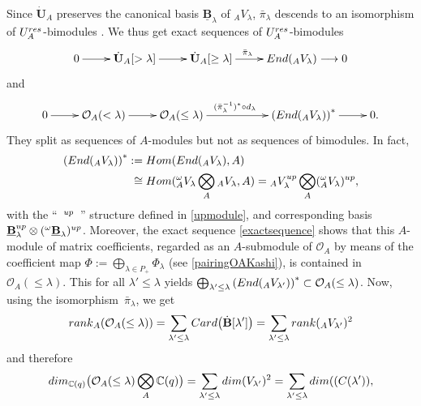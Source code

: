 \documentclass[11pt]{article}
\numberwithin{equation}{section}
\numberwithin{equation}{section}
\theoremstyle{definition}
\newcommand{\mc}{\mathbb{C}}
\newcommand{\Oo}{{\mathcal O}}
\newcommand{\ra}{\rightarrow}
\begin{document}
Since $\dot{\mathbf{U}}_A$ preserves the canonical basis $\underline{\mathbf{B}}_\lambda$ of ${}_AV_\lambda$, $\bar{\pi}_\lambda$ descends to an isomorphism of $U_A^{\rm res}$-bimodules \smash{$\bar{\pi}_\lambda\colon \dot{\mathbf{U}}_A [\geq \lambda]/ \dot{\mathbf{U}}_A [> \lambda] \ra {\rm End}({}_A V_\lambda)$}. We thus get exact sequences of $U_A^{\rm res}$-bi\-mod\-ules%
\[\xymatrix{0 \ar[r] & \dot{\mathbf{U}}_A [> \lambda] \ar[r] & \dot{\mathbf{U}}_A [\geq \lambda] \ar[r]^{\bar{\pi}_\lambda\quad \quad } & {\rm End}({}_A V_\lambda) \longrightarrow 0}\]
and
\begin{equation}\label{exactsequence}
\xymatrix{0 \ar[r] & \Oo_A(< \lambda) \ar[r] & \Oo_A(\leq \lambda) \ar[rr]^{(\bar{\pi}_\lambda^{-1})^*\circ d_\lambda\quad \ } & & \left({\rm End}({}_A V_\lambda)\right)^* \ar[r] & 0.}
\end{equation}
They split as sequences of $A$-modules but not as sequences of bimodules. In fact,
\begin{align}
\left({\rm End}({}_A V_\lambda)\right)^*:={}& {\rm Hom}({\rm End}({}_A V_\lambda),A )\nonumber\\
\cong{} &{\rm Hom}({}_A^{\omega} V_\lambda \bigotimes_A {}_A V_\lambda,A ) = {}_AV_\lambda^{\rm up} \bigotimes_A ({}_A^{\omega}V_\lambda)^{\rm up},\label{identcoeffmatup}
\end{align}
 with the ``\ ${}^{\rm up}$\ '' structure defined in \eqref{upmodule}, and corresponding basis $\underline{\mathbf{B}}_\lambda^{\rm up} \otimes ({}^{\omega}\underline{\mathbf{B}}_\lambda)^{\rm up}$. Moreover, the exact sequence \eqref{exactsequence} shows that this $A$-module of matrix coefficients, regarded as an $A$-submodule of $\Oo_A$ by means of the coefficient map $\Phi := \bigoplus_{\lambda\in P_+} \Phi_\lambda$ (see \eqref{pairingOAKashi}), is contained in $\Oo_A(\leq \lambda)$. This for all $\lambda'\leq \lambda$ yields $ \bigoplus_{\lambda'\leq \lambda} \left({\rm End}({}_A V_{\lambda'})\right)^* \subset \Oo_A(\leq \lambda)$. Now, using the isomorphism~$\bar{\pi}_\lambda$, we get
\[{\rm rank}_A(\Oo_A(\leq \lambda)) = \sum_{\lambda'\leq \lambda} {\rm Card}\bigl( \dot{\mathbf{B}}[\lambda']\bigr) = \sum_{\lambda'\leq \lambda} {\rm rank}({}_AV_{\lambda'})^2\]
and therefore
\begin{equation}\label{rankOqleq}
{\rm dim}_{\mc(q)}\bigl(\Oo_A(\leq \lambda) \bigotimes_A \mc(q)\bigr) = \sum_{\lambda'\leq \lambda} {\rm dim}(V_{\lambda'})^2 = \sum_{\lambda'\leq \lambda} {\rm dim}((C(\lambda')),
\end{equation}
\end{document}
